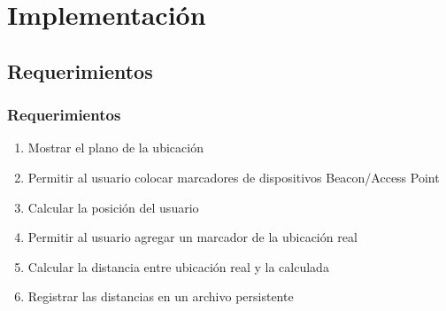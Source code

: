 \documentclass[mathserif]{beamer}
\begin{document}
\section{Implementación}

\subsection{Requerimientos}
\begin{frame}
\frametitle{Requerimientos}

\begin{enumerate}[1]
\pause
\item Mostrar el plano de la ubicación
\pause
\item Permitir al usuario colocar marcadores de dispositivos Beacon/Access Point
\pause
\item Calcular la posición del usuario
\pause
\item Permitir al usuario agregar un marcador de la ubicación real
\pause
\item Calcular la distancia entre ubicación real y la calculada
\pause
\item Registrar las distancias en un archivo persistente
\end{enumerate}


\end{frame}

\end{document}

